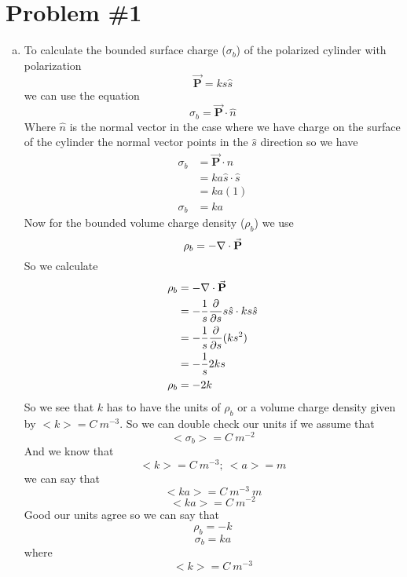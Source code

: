 \documentclass[11pt]{article}
\numberwithin{equation}{section}
\newcommand{\grad}{\bold\nabla}
\newcommand{\vecP}{\vec{\mathbf{P}}}
\begin{document}


\section{Problem \#1}
\begin{enumerate}[(a)]
\item
To calculate the bounded surface charge ($\sigma_b$) of the polarized cylinder with polarization
$$\vecP = ks\hat{s}$$
we can use the equation 
\begin{equation}
\sigma_b = \vecP\cdot\hat{n}
\label{sigb}
\end{equation}
Where $\hat{n}$ is the normal vector in the case where we have charge on the surface of the cylinder the normal vector points in the $\hat{s}$ direction so we have
\begin{align*}
\sigma_b &= \vecP\cdot\hat{n}\\
&= ka\hat{s}\cdot\hat{s}\\
&= ka(1)\\
\sigma_b &= ka
\end{align*}
Now for the bounded volume charge density ($\rho_b$) we use
\begin{equation}
\rho_b = -\grad\cdot\vecP
\label{rhob}
\end{equation}
So we calculate 
\begin{align*}
\rho_b &= -\grad\cdot\vecP\\
&= -\frac{1}{s}\frac{\partial}{\partial s}s\hat{s}\cdot ks\hat{s}\\
&= -\frac{1}{s}\frac{\partial}{\partial s}(ks^2)\\
&= -\frac{1}{s}2ks\\
\rho_b &= -2k
\end{align*}
So we see that $k$ has to have the units of $\rho_b$ or a volume charge density given by $<k> = C\ m^{-3}$. So we can double check our units if we assume that
$$<\sigma_b> = C\ m^{-2}$$
And we know that
$$<k> = C\ m^{-3};\ <a> = m$$
we can say that
$$<ka> = C\ m^{-3}\ m$$
$$<ka> = C\ m^{-2}$$
Good our units agree so we can say that
$$\rho_b = -k$$
$$\sigma_b = ka$$
where
$$<k> = C\ m^{-3}$$


\end{enumerate}
\end{document}
